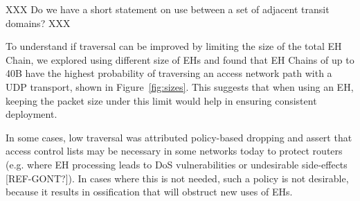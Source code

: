 \documentclass[conference]{IEEEtran}
\begin{document}

XXX Do we have a short statement on use between a set of adjacent transit domains? XXX

To understand if traversal can be improved by limiting the size of the total EH Chain, we explored using different size of EHs and found that EH Chains of up to 40B   have the highest probability of traversing an access network path with a UDP transport, shown in Figure~\ref{fig:sizes}.
 This suggests that when using an EH, keeping the packet size under this limit would help in ensuring consistent deployment.

 In some cases, low traversal was attributed policy-based dropping and assert that access control lists may be necessary in some networks today to protect routers (e.g. where EH processing leads to DoS vulnerabilities or undesirable side-effects [REF-GONT?]). In cases where this is not needed, such a policy is not desirable, because it results in ossification that will obstruct new uses of EHs.







\end{document}
